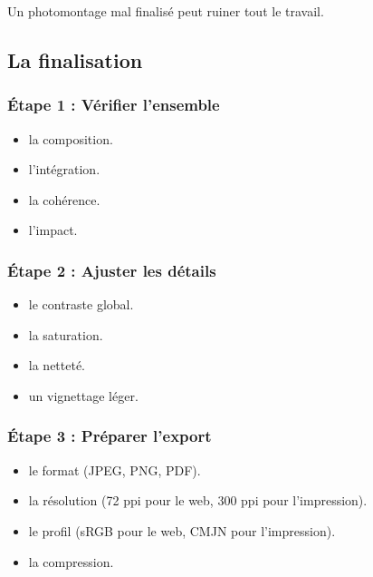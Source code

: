 Un photomontage mal finalisé peut ruiner tout le travail.

\subsection{La finalisation}

\subsubsection{Étape 1 : Vérifier l'ensemble}

\begin{itemize}
    \item {} la composition.
    \item {} l'intégration.
    \item {} la cohérence.
    \item {} l'impact.
\end{itemize}

\subsubsection{Étape 2 : Ajuster les détails}

\begin{itemize}
    \item {} le contraste global.
    \item {} la saturation.
    \item {} la netteté.
    \item {} un vignettage léger.
\end{itemize}

\subsubsection{Étape 3 : Préparer l'export}

\begin{itemize}
    \item {} le format (JPEG, PNG, PDF).
    \item {} la résolution (72 ppi pour le web, 300 ppi pour l'impression).
    \item {} le profil (sRGB pour le web, CMJN pour l'impression).
    \item {} la compression.
\end{itemize}

